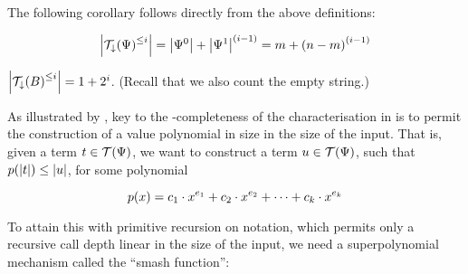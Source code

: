 The following corollary follows directly from the above definitions:

\begin{corollary}

$$\card{\mathcal{T}_\downarrow\p{\Psi}^{\leq i}} = \card{\Psi^0} +
\card{\Psi^1}^\p{i-1} = m + \p{n-m}^\p{i-1}$$

\end{corollary}

\begin{example} $\card{\mathcal{T}_\downarrow\p{B}^{\leq i}} = 1 + 2^i$.
(Recall that we also count the empty string.) \end{example}

As illustrated by , key to the
\FPTIME{}-completeness of the characterisation in \cite{cobham-1965} is to
permit the construction of a value polynomial in size in the size of the input.
That is, given a term $t \in \mathcal{T}\p{\Psi}$, we want to construct a term
$u \in \mathcal{T}\p{\Psi}$, such that $p\p{\card{t}} \leq \card{u}$, for some
polynomial

$$p\p{x}=c_1 \cdot x^{e_1} + c_2 \cdot x^{e_2} + \cdots + c_k \cdot x^{e_k}$$
 
To attain this with primitive recursion on notation, which
permits only a recursive call depth linear in the size of the input, we need a
superpolynomial mechanism called the ``smash function'': 






